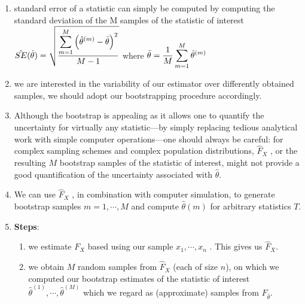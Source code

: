 \begin{enumerate}
    \item standard error of a statistic can simply be computed by computing the standard deviation of the M samples of the statistic of interest
    $
        \hat{SE}(\hat{\theta})
        = \sqrt{\dfrac{\displaystyle\sum^M_{m=1} \left(\hat{\theta}^{(m)}-\bar{\theta}\right)^2}{M-1}}
    $
    where
    $
        \bar{\theta} = \dfrac{1}{M} \displaystyle\sum^M_{m=1} \hat{\theta}^{(m)}
    $
    \hfill \cite{statistics/book/Statistics-for-Data-Scientists/Maurits-Kaptein}

    \item we are interested in the variability of our estimator over differently obtained samples, we should adopt our bootstrapping procedure accordingly.
    \hfill \cite{statistics/book/Statistics-for-Data-Scientists/Maurits-Kaptein}

    \item Although the bootstrap is appealing as it allows one to quantify the uncertainty for virtually any statistic—by simply replacing tedious analytical work with simple computer operations—one should always be careful: for complex sampling schemes and complex population distributions, $\hat{F}_X$ , or the resulting $M$ bootstrap samples of the statistic of interest, might not provide a good quantification of the uncertainty associated with $\hat{\theta}$.
    \hfill \cite{statistics/book/Statistics-for-Data-Scientists/Maurits-Kaptein}

    \item We can use $\hat{F}_X$ , in combination with computer simulation, to generate bootstrap samples $m = 1, \cdots , M$ and compute $\hat{\theta}(m)$ for arbitrary statistics $T $.
    \hfill \cite{statistics/book/Statistics-for-Data-Scientists/Maurits-Kaptein}

    \item \textbf{Steps}:
    \begin{enumerate}
        \item we estimate $F_X$ based using our sample $x_1, \cdots , x_n$ . This gives us $\hat{F}_X $.
        \hfill \cite{statistics/book/Statistics-for-Data-Scientists/Maurits-Kaptein}

        \item we obtain $M$ random samples from $\hat{F}_X$ (each of size $n$), on which we computed our bootstrap estimates of the statistic of interest $\hat{\theta}^{(1)} , \cdots, \hat{\theta}^{(M)}$ which we regard as (approximate) samples from $F_{\hat{\theta}}$.
        \hfill \cite{statistics/book/Statistics-for-Data-Scientists/Maurits-Kaptein}
    \end{enumerate}


\end{enumerate}

